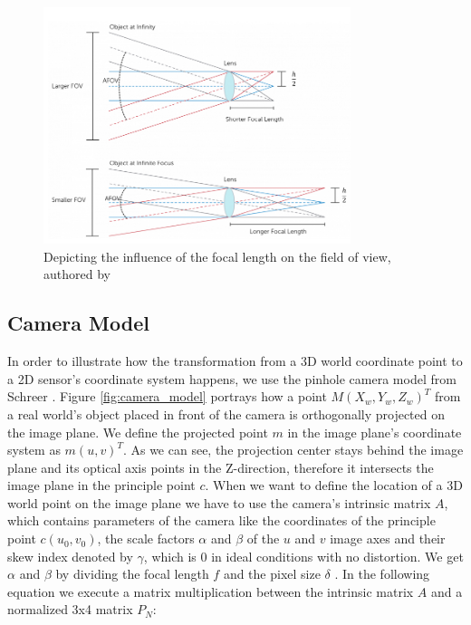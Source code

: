 \begin{figure}[h]
\centering
\includegraphics[width=0.8\textwidth]{images/camera_fov.png}
\caption[Single camera's FoV]{Depicting the influence of the focal length on the field of view, authored by \cite{camera_fov_website} \label{fig:camera_fov}}
\end{figure}

\subsection{Camera Model}\label{camera_model}
In order to illustrate how the transformation from a 3D world coordinate point to a 2D sensor's coordinate system happens, we use the pinhole camera model from Schreer \cite{camera_pinhole_model}. Figure \ref{fig:camera_model} portrays how a point $M(X_{w}, Y_{w}, Z_{w})^{T}$ from a real world's object placed in front of the camera is orthogonally projected on the image plane. We define the projected point $m$ in the image plane's coordinate system as $m(u,v)^{T}$. As we can see, the projection center stays behind the image plane and its optical axis points in the Z-direction, therefore it intersects the image plane in the principle point $c$. When we want to define the location of a 3D world point on the image plane we have to use the camera's intrinsic matrix $A$, which contains parameters of the camera like the coordinates of the principle point $c(u_{0},v_{0})$, the scale factors $\alpha$ and $\beta$ of the $u$ and $v$ image axes and their skew index denoted by $\gamma$, which is 0 in ideal conditions with no distortion. We get $\alpha$ and $\beta$ by dividing the focal length $f$ and the pixel size $\delta$ . In the following equation we execute a matrix multiplication between the intrinsic matrix $A$ and a normalized 3x4 matrix $P_{N}$:

